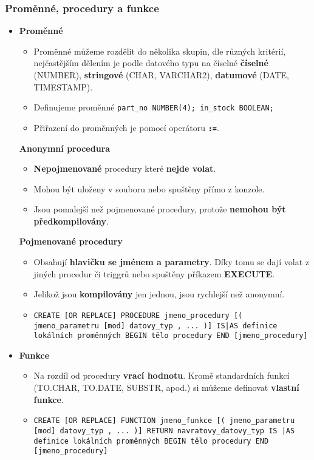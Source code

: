 \subsubsection{Proměnné, procedury a funkce}
\begin{itemize}
\item \textbf{Proměnné}
\begin{itemize}
\item Proměnné můžeme rozdělit do několika skupin, dle různých kritérií, nejčastějším dělením je podle datového typu na číselné \textbf{číselné} (NUMBER), \textbf{stringové} (CHAR, VARCHAR2), \textbf{datumové} (DATE, TIMESTAMP).
\item Definujeme proměnné \texttt{part\_no NUMBER(4); in\_stock BOOLEAN;}
\item Přiřazení do proměnných je pomocí operátoru \textbf{\texttt{:=}}.
\end{itemize}
\textbf{Anonymní procedura}
\begin{itemize}
\item \textbf{Nepojmenované} procedury které \textbf{nejde volat}.
\item Mohou být uloženy v souboru nebo spuštěny přímo z konzole.
\item Jsou pomalejší než pojmenované procedury, protože \textbf{nemohou být předkompilovány}.
\end{itemize}
\textbf{Pojmenované procedury}
\begin{itemize}
\item Obsahují \textbf{hlavičku se jménem a parametry}. Díky tomu se dají volat z jiných procedur či triggrů nebo spuštěny příkazem \textbf{EXECUTE}.
\item Jelikož jsou \textbf{kompilovány} jen jednou, jsou rychlejší než anonymní.
\item \texttt{CREATE [OR REPLACE] PROCEDURE jmeno\_procedury [( jmeno\_parametru [mod] datovy\_typ , ... )] IS|AS definice lokálních proměnných BEGIN tělo procedury END [jmeno\_procedury]}
\end{itemize}
\item\textbf{Funkce}
\begin{itemize}
\item Na rozdíl od procedury \textbf{vrací hodnotu}. Kromě standardních funkcí (TO.CHAR, TO.DATE, SUBSTR, apod.) si můžeme definovat \textbf{vlastní funkce}.
\item \texttt{CREATE [OR REPLACE] FUNCTION jmeno\_funkce [( jmeno\_parametru [mod] datovy\_typ , ... )] RETURN navratovy\_datovy\_typ IS |AS definice lokálních proměnných BEGIN tělo procedury END [jmeno\_procedury]}
\end{itemize}
\end{itemize}

